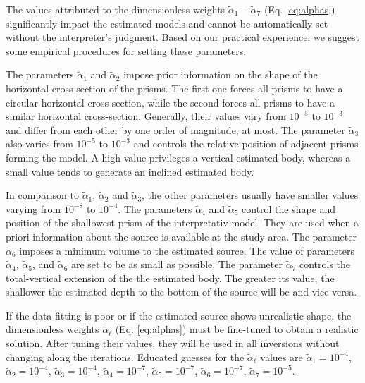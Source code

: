 
The values attributed to the dimensionless weights $\tilde{\alpha}_{1} - \tilde{\alpha}_{7}$ 
(Eq. \ref{eq:alphas}) significantly impact the estimated models and cannot be 
automatically set without the interpreter’s judgment. 
Based on our practical experience, we suggest some 
empirical procedures for setting these parameters.

The parameters $\tilde{\alpha}_1$ and $\tilde{\alpha}_2$ impose prior information 
on the shape of the horizontal cross-section of the prisms. 
The first one forces all prisms to have a circular horizontal cross-section, while 
the second forces all prisms to have a similar horizontal cross-section.
Generally, their values vary from $10^{-5}$ to $10^{-3}$ and differ from
each other by one order of magnitude, at most.
The parameter $\tilde{\alpha}_3$ also varies from $10^{-5}$ to $10^{-3}$ and 
controls the relative position of adjacent prisms forming the model.
A high value privileges a vertical estimated body, whereas a small value 
tends to generate an inclined estimated body.

In comparison to $\tilde{\alpha}_1$, $\tilde{\alpha}_2$ and $\tilde{\alpha}_3$,
the other parameters usually have smaller values varying from $10^{-8}$ to $10^{-4}$.
The parameters $\tilde{\alpha}_4$ and $\tilde{\alpha}_5$ control the shape and position of the shallowest prism of the interpretativ model. They are used when a priori
information about the source is available at the study area.
The parameter $\tilde{\alpha}_6$ imposes a minimum volume to the estimated source.
The value of parameters $\tilde{\alpha}_4$, $\tilde{\alpha}_5$, and $\tilde{\alpha}_6$ are set to be as small as possible.
The parameter $\tilde{\alpha}_7$ controls the total-vertical extension of the 
the estimated body. 
The greater its value, the shallower the estimated depth to the bottom of the source
will be and vice versa.

If the data fitting is poor or if the estimated source shows unrealistic shape,
the dimensionless weights $\tilde{\alpha}_{\ell}$ (Eq. \ref{eq:alphas}) must be
fine-tuned
to obtain a realistic solution. After tuning their values, they will be used in all
inversions without changing along the iterations. 
Educated guesses for the $\tilde{\alpha}_{\ell}$ values are 
$\tilde{\alpha}_1 = 10^{-4}$, $\tilde{\alpha}_2 = 10^{-4}$, $\tilde{\alpha}_3 = 10^{-4}$,
$\tilde{\alpha}_4 = 10^{-7}$, $\tilde{\alpha}_5 = 10^{-7}$, $\tilde{\alpha}_6 = 10^{-7}$, 
$\tilde{\alpha}_7 = 10^{-5}$.
